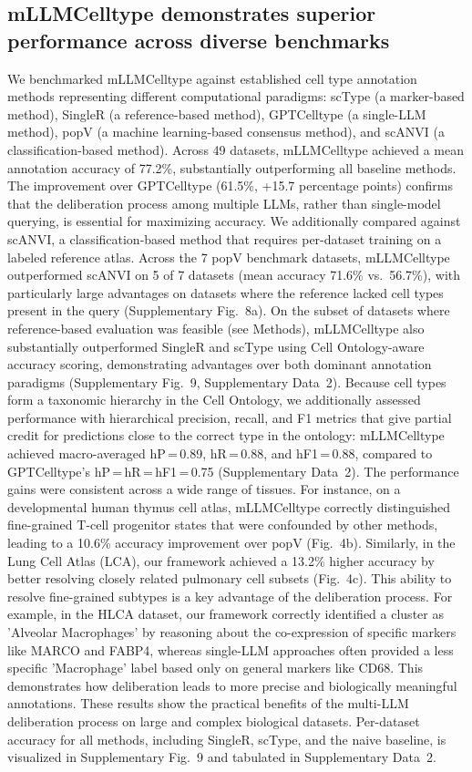 \documentclass[pdflatex,sn-nature]{sn-jnl}%
\theoremstyle{thmstyleone}%
\theoremstyle{thmstyletwo}%
\theoremstyle{thmstylethree}%
\begin{document}
\subsection{mLLMCelltype demonstrates superior performance across diverse benchmarks}
We benchmarked mLLMCelltype against established cell type annotation methods representing different computational paradigms: scType\cite{ianevski2022fully} (a marker-based method), SingleR\cite{aran2019reference} (a reference-based method), GPTCelltype (a single-LLM method), popV (a machine learning-based consensus method), and scANVI\cite{xu2021probabilistic} (a classification-based method). Across 49 datasets, mLLMCelltype achieved a mean annotation accuracy of 77.2\%, substantially outperforming all baseline methods. The improvement over GPTCelltype (61.5\%, +15.7 percentage points) confirms that the deliberation process among multiple LLMs, rather than single-model querying, is essential for maximizing accuracy. We additionally compared against scANVI, a classification-based method that requires per-dataset training on a labeled reference atlas. Across the 7 popV benchmark datasets, mLLMCelltype outperformed scANVI on 5 of 7 datasets (mean accuracy 71.6\% vs.\ 56.7\%), with particularly large advantages on datasets where the reference lacked cell types present in the query (Supplementary Fig.~8a). On the subset of datasets where reference-based evaluation was feasible (see Methods), mLLMCelltype also substantially outperformed SingleR and scType using Cell Ontology-aware accuracy scoring, demonstrating advantages over both dominant annotation paradigms (Supplementary Fig.~9, Supplementary Data~2). Because cell types form a taxonomic hierarchy in the Cell Ontology, we additionally assessed performance with hierarchical precision, recall, and F1 metrics\cite{kosmopoulos2015evaluation} that give partial credit for predictions close to the correct type in the ontology: mLLMCelltype achieved macro-averaged hP\,=\,0.89, hR\,=\,0.88, and hF1\,=\,0.88, compared to GPTCelltype's hP\,=\,hR\,=\,hF1\,=\,0.75 (Supplementary Data~2). The performance gains were consistent across a wide range of tissues. For instance, on a developmental human thymus cell atlas, mLLMCelltype correctly distinguished fine-grained T-cell progenitor states that were confounded by other methods, leading to a 10.6\% accuracy improvement over popV (Fig.~4b). Similarly, in the Lung Cell Atlas (LCA), our framework achieved a 13.2\% higher accuracy by better resolving closely related pulmonary cell subsets (Fig.~4c). This ability to resolve fine-grained subtypes is a key advantage of the deliberation process. For example, in the HLCA dataset, our framework correctly identified a cluster as 'Alveolar Macrophages' by reasoning about the co-expression of specific markers like MARCO and FABP4, whereas single-LLM approaches often provided a less specific 'Macrophage' label based only on general markers like CD68. This demonstrates how deliberation leads to more precise and biologically meaningful annotations. These results show the practical benefits of the multi-LLM deliberation process on large and complex biological datasets. Per-dataset accuracy for all methods, including SingleR, scType, and the naive baseline, is visualized in Supplementary Fig.~9 and tabulated in Supplementary Data~2.
\end{document}
